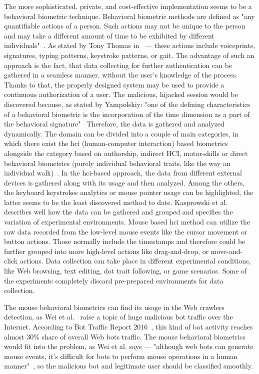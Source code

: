 The more sophisticated, private, and cost-effective implementation seems to be a behavioral biometric technique.
Behavioral biometric methods are defined as "any quantifiable actions of a person.
Such actions may not be unique to the person and may take a different amount of time to be exhibited by different individuals"~\cite{Yampolskiy2011}.
As stated by Tony Thomas in~\cite{thomas2020machine} --- these actions include voiceprints, signatures, typing patterns, keystroke patterns, or gait.
The advantage of such an approach is the fact, that data collecting for further authentication can be gathered in a seamless manner, without the user's knowledge of the process.
Thanks to that, the properly designed system may be used to provide a continuous authorization of a user.
The malicious, hijacked session would be discovered because, as stated by Yampolskiy: "one of the defining characteristics of a behavioral biometric is the incorporation of the time dimension as a part of the behavioral signature"~\cite{Yampolskiy2011}
Therefore, the data is gathered and analyzed dynamically.
The domain can be divided into a couple of main categories, in which there exist the \gls{hci} (human-computer interaction) based biometrics alongside the category based on authorship, indirect HCI, motor-skills or direct behavioral biometrics (purely individual behavioral traits, like the way an individual walk)~\cite{Yampolskiy2011}.
In the \gls{hci}-based approach, the data from different external devices is gathered along with its usage and then analyzed.
Among the others, the keyboard keystrokes analytics or mouse pointer usage can be highlighted, the latter seems to be the least discovered method to date.
Kasprowski et al.~\cite{kasprowski2018fusion} describes well how the data can be gathered and grouped and specifies the variation of experimental environments.
Mouse based \gls{hci} method can utilize the raw data recorded from the low-level mouse events like the cursor movement or button actions.
Those normally include the timestamps and therefore could be further grouped into more high-level actions like drag-and-drop, or move-and-click actions.
Data collection can take place in different experimental conditions, like Web browsing, text editing, dot trait following, or game scenarios.
Some of the experiments completely discard pre-prepared environments for data collection.

The mouse behavioral biometrics can find its usage in the Web crawlers detection, as Wei et al.~\cite{a-deep-learning-approach-to-web-bot-detection-using-mouse-behavioral-biometrics} raise a topic of huge malicious bot traffic over the Internet.
According to Bot Traffic Report 2016~\cite{bot-share-2016}, this kind of bot activity reaches almost 30\% share of overall Web bots traffic.
The mouse behavioral biometrics would fit into the problem, as Wei et al. says --- "although web bots can generate mouse events, it’s difficult for bots to perform mouse operations in a human manner"~\cite{a-deep-learning-approach-to-web-bot-detection-using-mouse-behavioral-biometrics}, so the malicious bot and legitimate user should be classified smoothly.